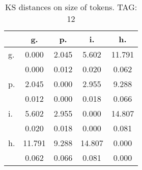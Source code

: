 \begin{table}[h!]
\begin{center}
\begin{tabular}{| l | c | c | c | c |}\hline
 & g. & p. & i. & h. \\\hline
g. & 0.000  & 2.045  & 5.602  & 11.791 \\\hline
 & 0.000  & 0.012  & 0.020  & 0.062 \\\hline
p. & 2.045  & 0.000  & 2.955  & 9.288 \\\hline
 & 0.012  & 0.000  & 0.018  & 0.066 \\\hline
i. & 5.602  & 2.955  & 0.000  & 14.807 \\\hline
 & 0.020  & 0.018  & 0.000  & 0.081 \\\hline
h. & 11.791  & 9.288  & 14.807  & 0.000 \\\hline
 & 0.062  & 0.066  & 0.081  & 0.000 \\\hline
\end{tabular}
\caption{KS distances on size of tokens. TAG: 12}
\end{center}
\end{table}